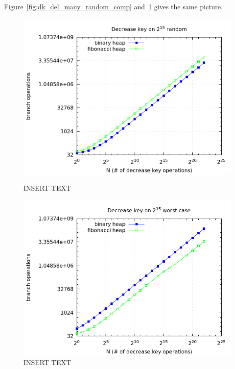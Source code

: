 \documentclass[a4paper,oneside,article,11pt]{memoir}
\begin{document}
Figure~\ref{fig:dk_del_many_random_comp} and~\ref{fig:dk_del_many_worst_comp} gives the same picture.

\begin{figure}[H]
\centering
\begin{minipage}{0.48\columnwidth}
  \centering
  \includegraphics[width=\linewidth]{../res/dk/dk_random_fixed_size_comp.png}%
  \caption{INSERT TEXT}
  \label{fig:dk_del_many_random_comp}
\end{minipage}%
\hfill
\begin{minipage}{0.48\columnwidth}
  \centering
  \includegraphics[width=\linewidth]{../res/dk/dk_worst_fixed_size_comp.png}%
  \caption{INSERT TEXT}
  \label{fig:dk_del_many_worst_comp}
\end{minipage}
\end{figure}
\end{document}
